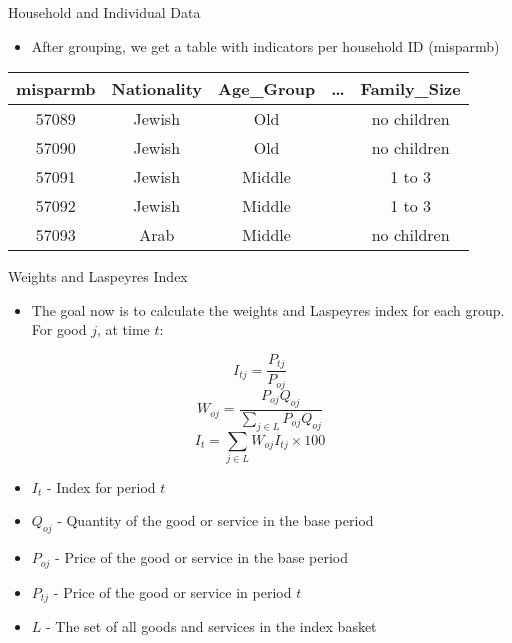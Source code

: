\documentclass{beamer}
\begin{document}
\begin{frame}{Household and Individual Data}
    \begin{itemize}
        \item After grouping, we get a table with indicators per household ID (misparmb)
    \end{itemize}
    \begin{table}[h]
        \centering
        \begin{tabular}{c c c c c}
            \hline
            misparmb & Nationality & Age\_Group & \ldots & Family\_Size \\
            \hline
            57089    & Jewish      & Old        &        & no children  \\
            57090    & Jewish      & Old        &        & no children  \\
            57091    & Jewish      & Middle     &        & 1 to 3       \\
            57092    & Jewish      & Middle     &        & 1 to 3       \\
            57093    & Arab        & Middle     &        & no children  \\
            \hline
        \end{tabular}
        \label{tab:grouped_data}
    \end{table}
\end{frame}

\begin{frame}{Weights and Laspeyres Index}
    \begin{itemize}
        \item The goal now is to calculate the weights and Laspeyres index for each group. For good $j$, at time $t$:
    \end{itemize}
    $$
        I_{tj}=\frac{P_{tj}}{P_{oj}}
    $$
    $$
        W_{oj}=\frac{P_{oj}Q_{oj}}{\sum_{j\in L}P_{oj}Q_{oj}}
    $$
    $$
        I_{t}=\sum_{j\in L}W_{oj}I_{tj}\times 100
    $$
    \begin{itemize}
        \item $I_{t}$ - Index for period $t$
        \item $Q_{oj}$ - Quantity of the good or service in the base period
        \item $P_{oj}$ - Price of the good or service in the base period
        \item $P_{tj}$ - Price of the good or service in period $t$
        \item $L$ - The set of all goods and services in the index basket
    \end{itemize}
\end{frame}
\end{document}
